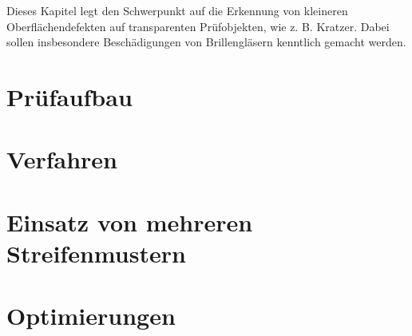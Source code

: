 Dieses Kapitel legt den Schwerpunkt auf die Erkennung von kleineren Oberflächendefekten auf transparenten Prüfobjekten, wie z. B. Kratzer.
Dabei sollen insbesondere Beschädigungen von Brillengläsern kenntlich gemacht werden.

{
	\FloatBarrier
    \section{Prüfaufbau}
    \label{sec:pruefaufbau}
    
}

{
	\FloatBarrier
    \section{Verfahren}
    \label{sec:verfahren}
    
}

{
	\FloatBarrier
    \section{Einsatz von mehreren Streifenmustern}
    \label{sec:einsatzVonMehrerenStreifenmustern}
    
}

{
	\FloatBarrier
    \section{Optimierungen}
    \label{sec:optimierungen}
    
}
